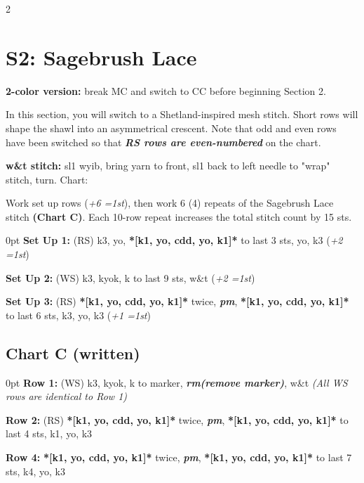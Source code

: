 \documentclass[12pt]{article}
\newcommand{\vocab}[1]{\emph{\textbf{#1}}} %
\newcommand{\rowDir}[1]{\textbf{#1:}} %
\renewcommand{\repeat}[1]{\textbf{*[#1]*}} %
\newcommand{\increase}[1]{(\emph{+#1 
	\ifnum#1=1{st}\else{sts}\fi})}
\renewcommand{\rm}{\vocab{rm}} %
\renewcommand{\pm}{\vocab{pm}} %
\newenvironment{frnote}
    {%
    	\setlength{\FrameRule}{1.5pt}
    	\def\FrameCommand{\fboxrule=\FrameRule\fboxsep=\FrameSep \fcolorbox{framecolor}{shadecolor}}
    	\MakeFramed {\FrameRestore}}
    {\setlength{\FrameRule}{1pt}
	\endMakeFramed}
\newenvironment{unframed}
    {%
	\setlength{\parindent}{-2em}
	\begin{addmargin}[2em]{0pt}}
    {\end{addmargin}
	\setlength{\parindent}{0em}}
\begin{document}
\begin{multicols}{2}
\section*{S2: Sagebrush Lace}

\begin{frnote}
\textbf{2-color version:} break MC and switch to CC before beginning Section 2.
\end{frnote}

In this section, you will switch to a Shetland-inspired mesh stitch. Short rows will shape the shawl into an asymmetrical crescent. Note that odd and even rows have been switched so that \vocab{RS rows are even-numbered} on the chart.

\begin{frnote}
\rowDir{w\&t stitch} sl1 wyib, bring yarn to front, sl1 back to left needle to "wrap" stitch, turn. Chart: 
\end{frnote}

Work set up rows \increase{6}, then work 6 (4) repeats of the Sagebrush Lace stitch \textbf{(Chart C)}. Each 10-row repeat increases the total stitch count by 15 sts.

\begin{unframed}
\hspace{-2em}\rowDir{Set Up 1} (RS) k3, yo, \repeat{k1, yo, cdd, yo, k1} to last 3 sts, yo, k3 \increase{2}

\rowDir{Set Up 2} (WS) k3, kyok, k to last 9 sts, w\&t \increase{2}

\rowDir{Set Up 3} (RS) \repeat{k1, yo, cdd, yo, k1} twice, \pm, \repeat{k1, yo, cdd, yo, k1} to last 6 sts, k3, yo, k3 \increase{1}
\end{unframed}

\subsection*{Chart C (written)}
\begin{unframed}
\hspace{-2em}\rowDir{Row 1} (WS) k3, kyok, k to marker, \rm \vocab{(remove marker)}, w\&t \emph{(All WS rows are identical to Row 1)}

\rowDir{Row 2} (RS) \repeat{k1, yo, cdd, yo, k1} twice, \pm, \repeat{k1, yo, cdd, yo, k1} to last 4 sts, k1, yo, k3

\rowDir{Row 4}  \repeat{k1, yo, cdd, yo, k1} twice, \pm, \repeat{k1, yo, cdd, yo, k1} to last 7 sts, k4, yo, k3


\end{unframed}
\end{multicols}
\end{document}
